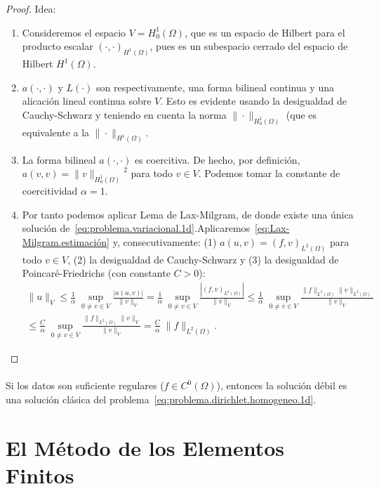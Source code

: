 \documentclass[11pt]{article}
\theoremstyle{plain}
\theoremstyle{definition}
\newcounter{stepnum}[section]
\newcommand{\step}[1][]{\bigskip\noindent\textbf{\thesection.\refstepcounter{stepnum}\thestepnum}.\enspace{#1}}
\renewcommand{\step}[1][]{\paragraph{#1}\hspace{-1.1em}}
\newcommand{\norm}[2][]{\ensuremath{\|#2\|_{#1}}}
\begin{document}
{\begin{proof}
  Idea:
  \begin{enumerate}
    \item Consideremos el espacio $V=H_0^1(\Omega)$, que es un espacio de Hilbert para el producto escalar $(\cdot,\cdot)_{H^1(\Omega)}$, pues es un subespacio cerrado del espacio de Hilbert $H^1(\Omega)$. 
    \item $a(\cdot,\cdot)$ y $L(\cdot)$ son respectivamente, una forma bilineal continua y una alicación lineal continua sobre $V$. Esto es evidente usando la desigualdad de Cauchy-Schwarz y teniendo en cuenta la norma $\norm[H_0^1(\Omega)]{\cdot}$ (que es equivalente a la $\norm[H^1(\Omega)]{\cdot}$.
    \item La forma bilineal $a(\cdot,\cdot)$ es coercitiva. De hecho, por definición, $a(v,v)=\norm[H_0^1(\Omega)]{v}^2$ para todo $v\in V$. Podemos tomar la constante de coercitividad $\alpha=1$.
  \item Por tanto podemos aplicar Lema de Lax-Milgram, de donde existe una única solución de~\eqref{eq:problema.variacional.1d}.Aplicaremos~\eqref{eq:Lax-Milgram.estimación} y, consecutivamente: (1) $a(u,v)=(f,v)_{L^2(\Omega)}$ para todo $v\in V$, (2) la desigualdad de Cauchy-Schwarz y (3) la desigualdad de Poincaré-Friedrichs (con constante $C>0$):
      \begin{align*}
        \norm[V]{u} \le 
        \frac 1 {\alpha}\;\sup_{0\neq v\in V}\frac{|a(u,v)|}{\norm[V]{v}} =
        \frac 1 {\alpha}\;\sup_{0\neq v\in V}\frac{|(f,v)_{L^2(\Omega)}|}{\norm[V]{v}}
        \le
        \frac 1 {\alpha}\;\sup_{0\neq v\in V}\frac{\norm[L^2(\Omega)]{f}\norm[L^2(\Omega)]{v}}{\norm[V]{v}}
        \\
        \le
        \frac C {\alpha}\;\sup_{0\neq v\in V}\frac{\norm[L^2(\Omega)]{f}\norm[V]{v}}{\norm[V]{v}}
        =
        \frac C {\alpha}\;\norm[L^2(\Omega)]{f}.
      \end{align*}
  \end{enumerate}
\end{proof}

\step{\textbf{Proposición}.}
Si los datos son suficiente regulares ($f\in C^0(\Omega)$), entonces la solución débil es una solución clásica del problema~\eqref{eq:problema.dirichlet.homogeneo.1d}.

\section{El Método de los Elementos Finitos}

}
\end{document}
